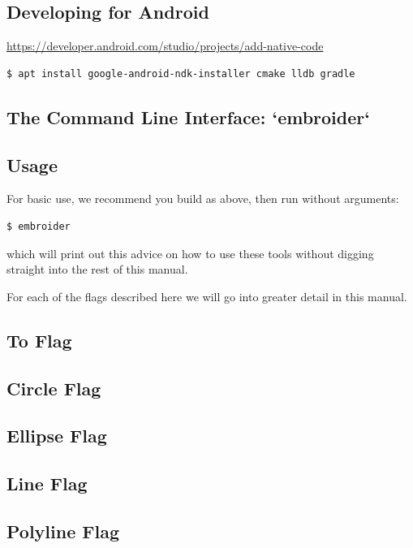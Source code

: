 \documentclass[10pt]{report}
\begin{document}
\subsection{Developing for Android}

\url{https://developer.android.com/studio/projects/add-native-code}

\begin{lstlisting}
$ apt install google-android-ndk-installer cmake lldb gradle
\end{lstlisting}

\subsection{The Command Line Interface: `embroider`}

\subsection{Usage}

For basic use, we recommend you build as above, then run without arguments:

\begin{lstlisting}
$ embroider
\end{lstlisting}

which will print out this advice on how to use these tools without digging straight into the rest of this manual.


For each of the flags described here we will go into greater detail in this manual.

\subsection{To Flag}

\subsection{Circle Flag}

\subsection{Ellipse Flag}

\subsection{Line Flag}

\subsection{Polyline Flag}
\end{document}
